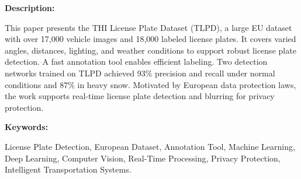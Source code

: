 { 
	\textbf{Description:}
	
	This paper presents the THI License Plate Dataset (TLPD), a large EU dataset with over 17,000 vehicle images and 18,000 labeled license plates. It covers varied angles, distances, lighting, and weather conditions to support robust license plate detection. A fast annotation tool enables efficient labeling. Two detection networks trained on TLPD achieved 93\% precision and recall under normal conditions and 87\% in heavy snow. Motivated by European data protection laws, the work supports real-time license plate detection and blurring for privacy protection.\autocite{Chan:2023}
	
	\textbf{Keywords:}
	
	License Plate Detection, European Dataset, Annotation Tool, Machine Learning, Deep Learning, Computer Vision, Real-Time Processing, Privacy Protection, Intelligent Transportation Systems.
}





